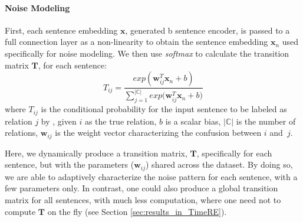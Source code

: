 \paragraph{Noise Modeling}
%
First, each sentence embedding $\mathbf{x}$,
generated b sentence encoder, is passed to a full connection layer as a  non-linearity to obtain the
sentence embedding $\mathbf{x}_n$ used specifically for noise modeling.
We then use \emph{softmax} to calculate the transition matrix $\mathbf{T}$, for each sentence:
%
\begin{equation}\label{eq_tm}
T_{ij} = \frac{exp({\mathbf{w}_{ij}^T \mathbf{x}_n + b})}{\sum_{j=1}^{|\mathbb{C}|}{exp({\mathbf{w}_{ij}^T \mathbf{x}_n + b}})}
\end{equation}
where $T_{ij}$ is the conditional probability for the input sentence to be labeled as relation $j$ by \DS, given $i$ as the true relation, $b$ is a scalar bias,  $|\mathbb{C}|$ is the number of relations, $\mathbf{w}_{ij}$ is the weight vector characterizing the confusion between $i$ and~$j$. %

Here, we dynamically produce a transition matrix, $\mathbf{T}$, specifically for each sentence, but with the parameters ($\mathbf{w}_{ij}$) shared across the dataset. By doing so, we are able to adaptively characterize the noise pattern for each sentence, with a few parameters only. In contrast, one could also produce a global transition matrix for all sentences, with much less computation, where one need not to compute $\mathbf{T}$ on the fly (see Section \ref{sec:results_in_TimeRE}).


